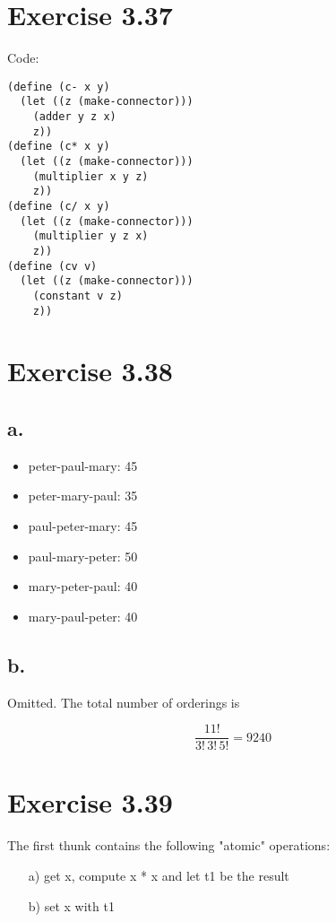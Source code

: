 \documentclass[../main.tex]{subfiles}
\begin{document}
\section{Exercise 3.37}

Code:

\begin{lstlisting}
(define (c- x y)
  (let ((z (make-connector)))
    (adder y z x)
    z))
(define (c* x y)
  (let ((z (make-connector)))
    (multiplier x y z)
    z))
(define (c/ x y)
  (let ((z (make-connector)))
    (multiplier y z x)
    z))
(define (cv v)
  (let ((z (make-connector)))
    (constant v z)
    z))
\end{lstlisting}

\section{Exercise 3.38}

\subsection{a.}

\begin{itemize}
\item peter-paul-mary: 45
\item peter-mary-paul: 35
\item paul-peter-mary: 45
\item paul-mary-peter: 50
\item mary-peter-paul: 40
\item mary-paul-peter: 40
\end{itemize}

\subsection{b.}

Omitted. The total number of orderings is

$$
\frac{11!}{3!\,3!\,5!} = 9240
$$

\section{Exercise 3.39}

The first thunk contains the following "atomic" operations:

\begin{itemize}
\item[a)] get x, compute x * x and let t1 be the result
\item[b)] set x with t1
\end{itemize}
\end{document}
